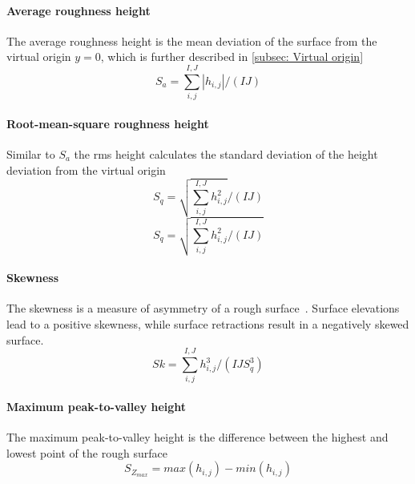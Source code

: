 \paragraph{Average roughness height}
The average roughness height is the mean deviation  of the surface from the virtual origin $y=0$, which is further described in \autoref{subsec: Virtual origin}
\begin{equation}\label{eq: avg roughness height}
    S_a = \sum_{i,j}^{I,J} |h_{i,j}| / (IJ)
\end{equation}
\paragraph{Root-mean-square roughness height}
Similar to $S_a$ the rms height calculates the standard deviation of the height deviation from the virtual origin
\begin{equation}
    S_q = \sqrt{\sum_{i,j}^{I,J} h_{i,j}^{2}} / (IJ)
\end{equation}
\begin{equation}
	S_q = \sqrt{\sum_{i,j}^{I,J} h_{i,j}^{2} / (IJ)}
\end{equation}
\paragraph{Skewness}
The skewness is a measure of asymmetry of a rough surface~\cite{chungPredictingDragRough2021}.
Surface elevations lead to a positive skewness, while surface retractions result in a negatively skewed surface.
\begin{equation}
    Sk = \sum_{i,j}^{I,J} h^{3}_{i,j} /(IJS_{q}^{3})
\end{equation}

\paragraph{Maximum peak-to-valley height}
The maximum peak-to-valley height is the difference between the highest and lowest point of the rough surface
\begin{equation}
    S_{Z_{max}} = max(h_{i,j}) - min(h_{i,j})
\end{equation}

